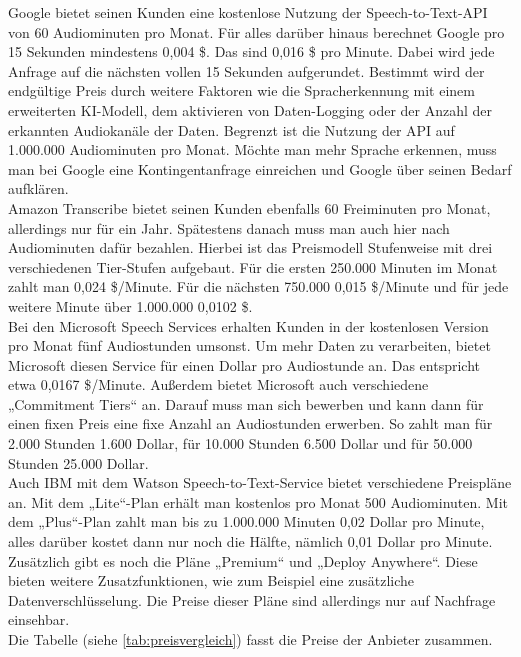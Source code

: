 Google bietet seinen Kunden eine kostenlose Nutzung der Speech-to-Text-API von 60 Audiominuten pro Monat. Für alles darüber hinaus berechnet Google pro 15 Sekunden mindestens 0,004 \$. Das sind 0,016 \$ pro Minute. Dabei wird jede Anfrage auf die nächsten vollen 15 Sekunden aufgerundet. Bestimmt wird der endgültige Preis durch weitere Faktoren wie die Spracherkennung mit einem erweiterten KI-Modell, dem aktivieren von Daten-Logging oder der Anzahl der erkannten Audiokanäle der Daten. Begrenzt ist die Nutzung der API auf 1.000.000 Audiominuten pro Monat. Möchte man mehr Sprache erkennen, muss man bei Google eine Kontingentanfrage einreichen und Google über seinen Bedarf aufklären. \cite[vgl.][]{GoogleCloud.PV.2022} \\ 
Amazon Transcribe bietet seinen Kunden ebenfalls 60 Freiminuten pro Monat, allerdings nur für ein Jahr. Spätestens danach muss man auch hier nach Audiominuten dafür bezahlen. Hierbei ist das Preismodell Stufenweise mit drei verschiedenen Tier-Stufen aufgebaut. Für die ersten 250.000 Minuten im Monat zahlt man 0,024 \$/Minute. Für die nächsten 750.000 0,015 \$/Minute und für jede weitere Minute über 1.000.000 0,0102 \$. \cite[vgl.][]{AWS.PV.2022} \\
Bei den Microsoft Speech Services erhalten Kunden in der kostenlosen Version pro Monat fünf Audiostunden umsonst. Um mehr Daten zu verarbeiten, bietet Microsoft diesen Service für einen Dollar pro Audiostunde an. Das entspricht etwa 0,0167 \$/Minute. Außerdem bietet Microsoft auch verschiedene „Commitment Tiers“ an. Darauf muss man sich bewerben und kann dann für einen fixen Preis eine fixe Anzahl an Audiostunden erwerben. So zahlt man für 2.000 Stunden 1.600 Dollar, für 10.000 Stunden 6.500 Dollar und für 50.000 Stunden 25.000 Dollar. \cite[vgl.][]{Azure.PV.2022} \\
Auch IBM mit dem Watson Speech-to-Text-Service bietet verschiedene Preispläne an. Mit dem „Lite“-Plan erhält man kostenlos pro Monat 500 Audiominuten. Mit dem „Plus“-Plan zahlt man bis zu 1.000.000 Minuten 0,02 Dollar pro Minute, alles darüber kostet dann nur noch die Hälfte, nämlich 0,01 Dollar pro Minute. Zusätzlich gibt es noch die Pläne „Premium“ und „Deploy Anywhere“. Diese bieten weitere Zusatzfunktionen, wie zum Beispiel eine zusätzliche Datenverschlüsselung. Die Preise dieser Pläne sind allerdings nur auf Nachfrage einsehbar. \cite[vgl.][]{IBM.PV.2021} \\

Die Tabelle (siehe \autoref{tab:preisvergleich}) fasst die Preise der Anbieter zusammen. \\

